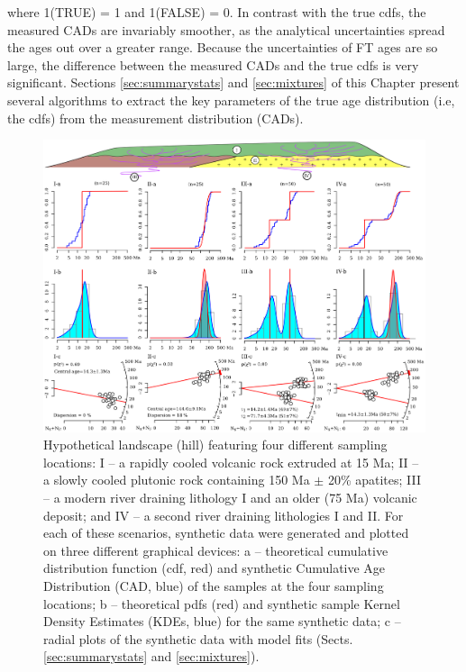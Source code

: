 \documentclass{article}
\begin{document}
where 1(TRUE) = 1 and 1(FALSE) = 0. In contrast with the true cdfs,
the measured CADs are invariably smoother, as the analytical
uncertainties spread the ages out over a greater range. Because the
uncertainties of FT ages are so large, the difference between the
measured CADs and the true cdfs is very significant. Sections
\ref{sec:summarystats} and \ref{sec:mixtures} of this Chapter present
several algorithms to extract the key parameters of the true age
distribution (i.e, the cdfs) from the measurement distribution (CADs).

\begin{figure}
\centering
\includegraphics[width=\textwidth]{ABCD2.png}
\caption{Hypothetical landscape (hill) featuring four different
  sampling locations: I -- a rapidly cooled volcanic rock extruded at
  15 Ma; II -- a slowly cooled plutonic rock containing 150 Ma $\pm$
  20\% apatites; III -- a modern river draining lithology I and an
  older (75 Ma) volcanic deposit; and IV -- a second river draining
  lithologies I and II. For each of these scenarios, synthetic data
  were generated and plotted on three different graphical devices: a
  -- theoretical cumulative distribution function (cdf, red) and
  synthetic Cumulative Age Distribution (CAD, blue) of the samples at
  the four sampling locations; b -- theoretical pdfs (red) and
  synthetic sample Kernel Density Estimates (KDEs, blue) for the same
  synthetic data; c -- radial plots of the synthetic data with model
  fits (Sects. \ref{sec:summarystats} and \ref{sec:mixtures}).}
\label{fig:ABCD}
\end{figure}
\end{document}
